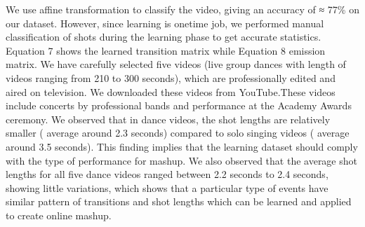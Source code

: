 \documentclass{sig-alternate}
\begin{document}
We use affine transformation to classify the video, giving an accuracy of ≈ 77\% on our dataset. However, since learning is onetime job, we performed manual classification of shots during the learning phase to get accurate statistics. Equation 7 shows the learned transition matrix while Equation 8 emission matrix. We have carefully selected five videos (live group dances with length of videos ranging from 210 to 300 seconds), which are professionally edited and aired on television. We downloaded these videos from YouTube.These videos include concerts by professional bands and performance at the Academy Awards ceremony. We observed that in dance videos, the shot lengths are relatively smaller ( average around 2.3 seconds) compared to solo singing videos ( average around 3.5 seconds). This finding implies that the learning dataset should comply with the type of performance for mashup. We also observed that the average shot lengths for all five dance videos ranged between 2.2 seconds to 2.4 seconds, showing little variations, which shows that a particular type of events have similar pattern of transitions and shot lengths which can be learned and applied to create online mashup.
\end{document}
